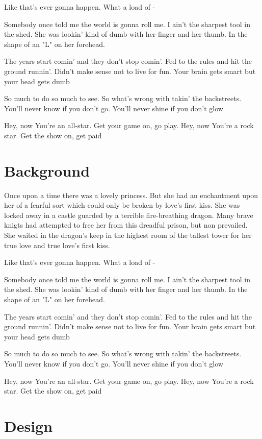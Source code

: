 \documentclass{article}
\begin{document}
Like that's ever gonna happen.  What a load of - 

Somebody once told me the world is gonna roll me. I ain't the sharpest tool in the shed. She was lookin' kind of dumb with her finger and her thumb.  In the shape of an "L" on her forehead.

The years start comin' and they don't stop comin'. Fed to the rules and hit the ground runnin'.  Didn't make sense not to live for fun.  Your brain gets smart but your head gets dumb

So much to do so much to see. So what's wrong with takin' the backstreets.  You'll never know if you don't go.  You'll never shine if you don't glow 

Hey, now You're an all-star.  Get your game on, go play.  Hey, now You're a rock star.  Get the show on, get paid

\section{Background}

Once upon a time there was a lovely princess.  But she had an enchantment upon her of a fearful sort which could only be broken by love's first kiss.  She was locked away in a castle guarded by a terrible fire-breathing dragon.  Many brave knigts had attempted to free her from this dreadful prison, but non prevailed.  She waited in the dragon's keep in the highest room of the tallest tower for her true love and true love's first kiss.

Like that's ever gonna happen.  What a load of - 

Somebody once told me the world is gonna roll me. I ain't the sharpest tool in the shed. She was lookin' kind of dumb with her finger and her thumb.  In the shape of an "L" on her forehead.

The years start comin' and they don't stop comin'. Fed to the rules and hit the ground runnin'.  Didn't make sense not to live for fun.  Your brain gets smart but your head gets dumb

So much to do so much to see. So what's wrong with takin' the backstreets.  You'll never know if you don't go.  You'll never shine if you don't glow 

Hey, now You're an all-star.  Get your game on, go play.  Hey, now You're a rock star.  Get the show on, get paid

\section{Design}
\end{document}
